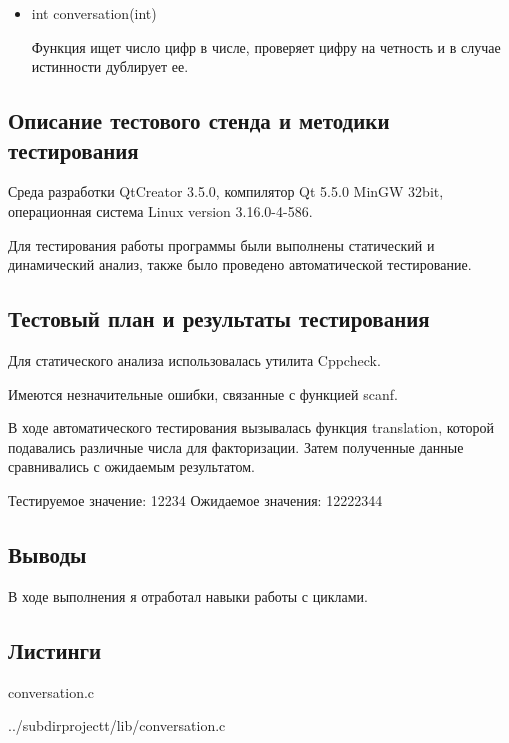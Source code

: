 \documentclass[12pt,a4paper]{report}
\begin{document}
\begin{itemize}
	\item int conversation(int)

	Функция ищет число цифр в числе, проверяет цифру на четность и в случае истинности дублирует ее.
\end{itemize}


\subsection{Описание тестового стенда и методики тестирования}

Среда разработки QtCreator 3.5.0, компилятор Qt 5.5.0 MinGW 32bit, операционная система Linux version 3.16.0-4-586.

Для тестирования работы программы были выполнены статический и динамический анализ, также было проведено автоматической тестирование.

\subsection{Тестовый план и результаты тестирования}

	Для статического анализа использовалась утилита Cppcheck.
	
	\vspace{\baselineskip}
	
	Имеются незначительные ошибки, связанные с функцией scanf.
	
	

	\vspace{\baselineskip}
	
	В ходе автоматического тестирования  вызывалась функция translation, которой подавались различные числа для факторизации. Затем полученные данные сравнивались с ожидаемым результатом. 
	 
	 \vspace{\baselineskip}
 Тестируемое значение: 
	12234
Ожидаемое значения: 
	12222344

\subsection{Выводы}
В ходе выполнения я отработал навыки работы с циклами.
\subsection*{Листинги}
conversation.c

{../subdirprojectt/lib/conversation.c}

\vspace{\baselineskip}
\end{document}
